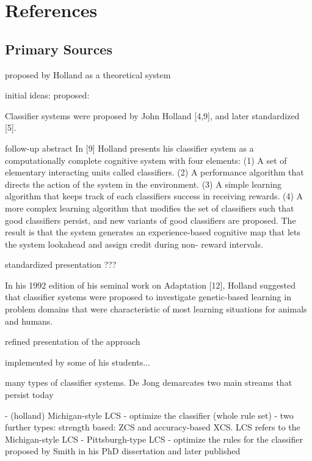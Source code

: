 \documentclass[a4paper, 11pt]{article}
\begin{document}
\section{References}
\label{sec:references}

% 
% 
\subsection{Primary Sources}

proposed by Holland as a theoretical system

initial ideas:
proposed: \cite{Holland1976}


Classifier systems were proposed by John Holland [4,9], and later standardized [5]. 

follow-up abstract \cite{Holland1977}
In [9] Holland presents his classifier system as a computationally complete cognitive system with four elements: (1) A set of elementary interacting units called classifiers. (2) A performance algorithm that directs the action of the system in the environment. (3) A simple learning algorithm that keeps track of each classifiers success in receiving rewards. (4) A more complex learning algorithm that modifies the set of classifiers such that good classifiers persist, and new variants of good classifiers are proposed. The result is that the system generates an experience-based cognitive map that lets the system lookahead and assign credit during non-
reward intervals.

standardized presentation \cite{Holland1980}
???

In his 1992 edition of his seminal work on Adaptation [12], Holland suggested that classifier systems were proposed to investigate genetic-based learning in problem domains that were characteristic of most learning situations for animals and humans.

refined presentation of the approach \cite{Holland1989}

implemented by some of his students...

many types of classifier systems. De Jong demarcates two main streams that persist today \cite{Jong1988}

- (holland) Michigan-style LCS - optimize the classifier (whole rule set) 
	- two further types: strength based: ZCS and accuracy-based XCS.
LCS refers to the Michigan-style LCS
- Pittsburgh-type LCS - optimize the rules for the classifier proposed by Smith in his PhD dissertation \cite{Smith1980} and later published \cite{Smith1983}
\end{document}
